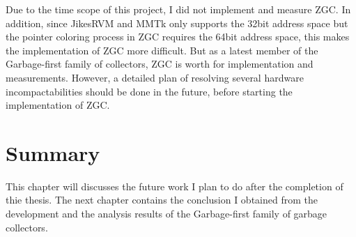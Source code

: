Due to the time scope of this project, I did not implement and measure ZGC.
In addition, since JikesRVM and MMTk only supports the 32bit address space but the pointer
coloring process in ZGC requires the 64bit address space, this makes the implementation
of ZGC more difficult.
But as a latest member of the Garbage-first family of collectors, ZGC is
worth for implementation and measurements.
However, a detailed plan of resolving several hardware incompactabilities should be done in the future,
before starting the implementation of ZGC.

\section{Summary}

This chapter will discusses the future work I plan to do after the completion
of thie thesis. The next chapter contains the conclusion I obtained from the
development and the analysis results of the Garbage-first family of garbage collectors.